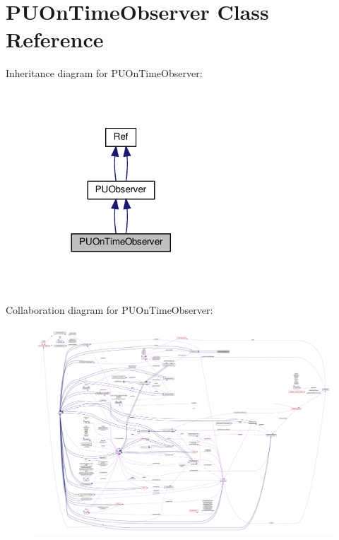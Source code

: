 \hypertarget{classPUOnTimeObserver}{}\section{P\+U\+On\+Time\+Observer Class Reference}
\label{classPUOnTimeObserver}


Inheritance diagram for P\+U\+On\+Time\+Observer\+:
\nopagebreak
\begin{figure}[H]
\begin{center}
\leavevmode
\includegraphics[width=185pt]{classPUOnTimeObserver__inherit__graph}
\end{center}
\end{figure}


Collaboration diagram for P\+U\+On\+Time\+Observer\+:
\nopagebreak
\begin{figure}[H]
\begin{center}
\leavevmode
\includegraphics[width=350pt]{classPUOnTimeObserver__coll__graph}
\end{center}
\end{figure}
